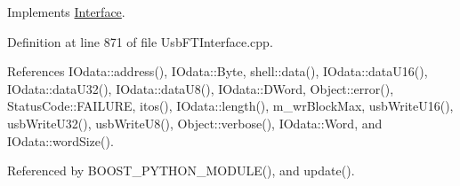 Implements \hyperlink{classInterface_ad665cacbaf490a26c1c4ba192022e68a}{Interface}.



Definition at line 871 of file Usb\+F\+T\+Interface.\+cpp.



References I\+Odata\+::address(), I\+Odata\+::\+Byte, shell\+::data(), I\+Odata\+::data\+U16(), I\+Odata\+::data\+U32(), I\+Odata\+::data\+U8(), I\+Odata\+::\+D\+Word, Object\+::error(), Status\+Code\+::\+F\+A\+I\+L\+U\+RE, itos(), I\+Odata\+::length(), m\+\_\+wr\+Block\+Max, usb\+Write\+U16(), usb\+Write\+U32(), usb\+Write\+U8(), Object\+::verbose(), I\+Odata\+::\+Word, and I\+Odata\+::word\+Size().



Referenced by B\+O\+O\+S\+T\+\_\+\+P\+Y\+T\+H\+O\+N\+\_\+\+M\+O\+D\+U\+L\+E(), and update().



